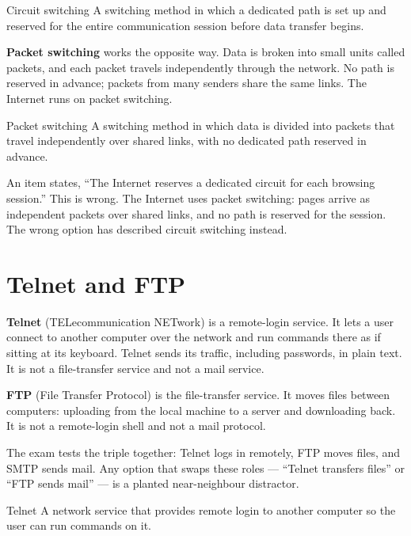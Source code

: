\begin{definitionbox}{Circuit switching}
A switching method in which a dedicated path is set up and reserved for the
entire communication session before data transfer begins.
\end{definitionbox}

\textbf{Packet switching} works the opposite way. Data is broken into small
units called packets, and each packet travels independently through the
network. No path is reserved in advance; packets from many senders share the
same links. The Internet runs on packet switching.

\begin{definitionbox}{Packet switching}
A switching method in which data is divided into packets that travel
independently over shared links, with no dedicated path reserved in advance.
\end{definitionbox}

\begin{example}
An item states, ``The Internet reserves a dedicated circuit for each browsing
session.'' This is wrong. The Internet uses packet switching: pages arrive as
independent packets over shared links, and no path is reserved for the session.
The wrong option has described circuit switching instead.
\end{example}

\section{Telnet and FTP}
\textbf{Telnet} (TELecommunication NETwork) is a remote-login service. It lets
a user connect to another computer over the network and run commands there as
if sitting at its keyboard. Telnet sends its traffic, including passwords, in
plain text. It is not a file-transfer service and not a mail service.

\textbf{FTP} (File Transfer Protocol) is the file-transfer service. It moves
files between computers: uploading from the local machine to a server and
downloading back. It is not a remote-login shell and not a mail protocol.

The exam tests the triple together: Telnet logs in remotely, FTP moves files,
and SMTP sends mail. Any option that swaps these roles --- ``Telnet transfers
files'' or ``FTP sends mail'' --- is a planted near-neighbour distractor.

\begin{definitionbox}{Telnet}
A network service that provides remote login to another computer so the user
can run commands on it.
\end{definitionbox}

